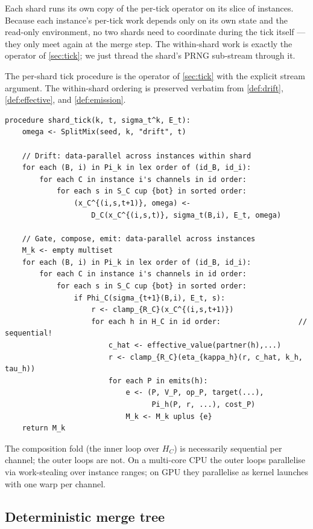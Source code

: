\documentclass[journal,onecolumn,11pt]{IEEEtran}
\theoremstyle{definition}
\begin{document}
Each shard runs its own copy of the per-tick operator on its slice of instances. Because each instance's per-tick work depends only on its own state and the read-only environment, no two shards need to coordinate during the tick itself --- they only meet again at the merge step. The within-shard work is exactly the operator of \cref{sec:tick}; we just thread the shard's PRNG sub-stream through it.

The per-shard tick procedure is the operator of \cref{sec:tick} with the explicit stream argument. The within-shard ordering is preserved verbatim from \cref{def:drift}, \cref{def:effective}, and \cref{def:emission}.

\begin{verbatim}
procedure shard_tick(k, t, sigma_t^k, E_t):
    omega <- SplitMix(seed, k, "drift", t)

    // Drift: data-parallel across instances within shard
    for each (B, i) in Pi_k in lex order of (id_B, id_i):
        for each C in instance i's channels in id order:
            for each s in S_C cup {bot} in sorted order:
                (x_C^{(i,s,t+1)}, omega) <-
                    D_C(x_C^{(i,s,t)}, sigma_t(B,i), E_t, omega)

    // Gate, compose, emit: data-parallel across instances
    M_k <- empty multiset
    for each (B, i) in Pi_k in lex order of (id_B, id_i):
        for each C in instance i's channels in id order:
            for each s in S_C cup {bot} in sorted order:
                if Phi_C(sigma_{t+1}(B,i), E_t, s):
                    r <- clamp_{R_C}(x_C^{(i,s,t+1)})
                    for each h in H_C in id order:                  // sequential!
                        c_hat <- effective_value(partner(h),...)
                        r <- clamp_{R_C}(eta_{kappa_h}(r, c_hat, k_h, tau_h))
                        for each P in emits(h):
                            e <- (P, V_P, op_P, target(...),
                                  Pi_h(P, r, ...), cost_P)
                            M_k <- M_k uplus {e}
    return M_k
\end{verbatim}

The composition fold (the inner loop over $H_C$) is necessarily sequential per channel; the outer loops are not. On a multi-core CPU the outer loops parallelise via work-stealing over instance ranges; on GPU they parallelise as kernel launches with one warp per channel.

\subsection{Deterministic merge tree}
\end{document}
